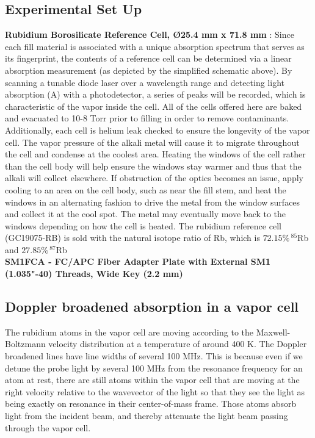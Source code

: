 \documentclass[10pt]{article}
\begin{document}
\subsection*{Experimental Set Up}
\textbf{Rubidium Borosilicate Reference Cell, Ø25.4 mm x 71.8 mm } :
Since each fill material is associated with a unique absorption spectrum that serves as its fingerprint, the contents of a reference cell can be determined via a linear absorption measurement (as depicted by the simplified schematic above). By scanning a tunable diode laser over a wavelength range and detecting light absorption (A) with a photodetector, a series of peaks will be recorded, which is characteristic of the vapor inside the cell.
All of the cells offered here are baked and evacuated to 10-8 Torr prior to filling in order to remove contaminants. Additionally, each cell is helium leak checked to ensure the longevity of the vapor cell. The vapor pressure of the alkali metal will cause it to migrate throughout the cell and condense at the coolest area. Heating the windows of the cell rather than the cell body will help ensure the windows stay warmer and thus that the alkali will collect elsewhere. If obstruction of the optics becomes an issue, apply cooling to an area on the cell body, such as near the fill stem, and heat the windows in an alternating fashion to drive the metal from the window surfaces and collect it at the cool spot. The metal may eventually move back to the windows depending on how the cell is heated.
The rubidium reference cell (GC19075-RB) is sold with the natural isotope ratio of Rb, which is $72.15\% \, ^{85}$Rb and $27.85\% \, ^{87}$Rb  \\
\textbf{SM1FCA - FC/APC Fiber Adapter Plate with External SM1 (1.035"-40) Threads, Wide Key (2.2 mm)}

\subsection*{Doppler broadened absorption in a vapor cell}
The rubidium atoms in the vapor cell are moving according to the Maxwell-Boltzmann velocity distribution at a temperature of around 400 K. The Doppler broadened lines have line widths of several 100 MHz. This is because even if we detune the probe light by several 100 MHz from the resonance frequency for an atom at rest, there are still atoms within the vapor cell that are moving at the right velocity relative to the wavevector of the light so that they see the light as being exactly on resonance in their center-of-mass frame. Those atoms absorb light from the incident beam, and thereby attenuate the light beam passing through the vapor cell.
\end{document}
